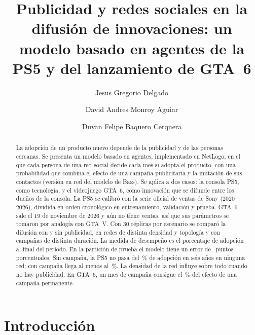 \documentclass{llncs}
\begin{document}
\title{Publicidad y redes sociales en la difusión de innovaciones: un modelo basado en agentes de la PS5 y del lanzamiento de GTA~6}

\author{Jesus Gregorio Delgado \and David Andres Monroy Aguiar \and Duvan Felipe Baquero Cerquera}


\maketitle

\begin{abstract}
La adopción de un producto nuevo depende de la publicidad y de las personas cercanas. Se presenta un modelo basado en agentes, implementado en NetLogo, en el que cada persona de una red social decide cada mes si adopta el producto, con una probabilidad que combina el efecto de una campaña publicitaria y la imitación de sus contactos (versión en red del modelo de Bass). Se aplica a dos casos: la consola PS5, como tecnología, y el videojuego GTA~6, como innovación que se difunde entre los dueños de la consola. La PS5 se calibró con la serie oficial de ventas de Sony (2020--2026), dividida en orden cronológico en entrenamiento, validación y prueba. GTA~6 sale el 19 de noviembre de 2026 y aún no tiene ventas, así que sus parámetros se tomaron por analogía con GTA~V. Con 30 réplicas por escenario se comparó la difusión con y sin publicidad, en redes de distinta densidad y topología y con campañas de distinta duración. La medida de desempeño es el porcentaje de adopción al final del período. En la partición de prueba el modelo tiene un error de \cifraAbmRmsePru\ puntos porcentuales. Sin campaña, la PS5 no pasa del \cifraPsSinMaxGlobal\,\% de adopción en seis años en ninguna red; con campaña llega al menos al \cifraPsConMin\,\%. La densidad de la red influye sobre todo cuando no hay publicidad. En GTA~6, un mes de campaña consigue el \cifraFraccionGtaDUno\,\% del efecto de una campaña permanente.

\end{abstract}

\section{Introducción}
\end{document}
